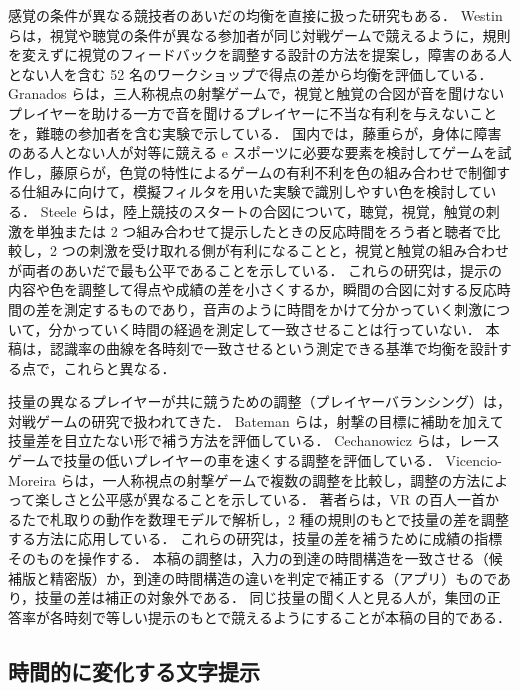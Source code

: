 感覚の条件が異なる競技者のあいだの均衡を直接に扱った研究もある．
Westin らは，視覚や聴覚の条件が異なる参加者が同じ対戦ゲームで競えるように，規則を変えずに視覚のフィードバックを調整する設計の方法を提案し，障害のある人とない人を含む 52 名のワークショップで得点の差から均衡を評価している\cite{westin2017}．
Granados らは，三人称視点の射撃ゲームで，視覚と触覚の合図が音を聞けないプレイヤーを助ける一方で音を聞けるプレイヤーに不当な有利を与えないことを，難聴の参加者を含む実験で示している\cite{granados2024}．
国内では，藤重らが，身体に障害のある人とない人が対等に競える e スポーツに必要な要素を検討してゲームを試作し\cite{fujishige2019}，藤原らが，色覚の特性によるゲームの有利不利を色の組み合わせで制御する仕組みに向けて，模擬フィルタを用いた実験で識別しやすい色を検討している\cite{fujiwara2021}．
Steele らは，陸上競技のスタートの合図について，聴覚，視覚，触覚の刺激を単独または 2 つ組み合わせて提示したときの反応時間をろう者と聴者で比較し，2 つの刺激を受け取れる側が有利になることと，視覚と触覚の組み合わせが両者のあいだで最も公平であることを示している\cite{steele2026}．
これらの研究は，提示の内容や色を調整して得点や成績の差を小さくするか，瞬間の合図に対する反応時間の差を測定するものであり，音声のように時間をかけて分かっていく刺激について，分かっていく時間の経過を測定して一致させることは行っていない．
本稿は，認識率の曲線を各時刻で一致させるという測定できる基準で均衡を設計する点で，これらと異なる．

技量の異なるプレイヤーが共に競うための調整（プレイヤーバランシング）は，対戦ゲームの研究で扱われてきた．
Bateman らは，射撃の目標に補助を加えて技量差を目立たない形で補う方法を評価している\cite{bateman2011}．
Cechanowicz らは，レースゲームで技量の低いプレイヤーの車を速くする調整を評価している\cite{cechanowicz2014}．
Vicencio-Moreira らは，一人称視点の射撃ゲームで複数の調整を比較し，調整の方法によって楽しさと公平感が異なることを示している\cite{vicencio2015}．
著者らは，VR の百人一首かるたで札取りの動作を数理モデルで解析し，2 種の規則のもとで技量の差を調整する方法に応用している\cite{maruyama2025jssst}．
これらの研究は，技量の差を補うために成績の指標そのものを操作する．
本稿の調整は，入力の到達の時間構造を一致させる（候補版と精密版）か，到達の時間構造の違いを判定で補正する（アプリ）ものであり，技量の差は補正の対象外である．
同じ技量の聞く人と見る人が，集団の正答率が各時刻で等しい提示のもとで競えるようにすることが本稿の目的である．

\subsection{時間的に変化する文字提示}

